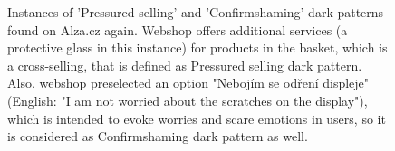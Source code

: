             \begin{figure}[ht]
                \RawFloats
                \centering
                \begin{minipage}[ht]{0.55\linewidth}
                    \strut\vspace*{-\baselineskip}\newline
                    \centering
                    \caption{Instances of 'Pressured selling' and 'Confirmshaming' dark patterns found on Alza.cz again. Webshop offers additional services (a protective glass in this instance) for products in the basket, which is a cross-selling, that is defined as Pressured selling dark pattern. Also, webshop preselected an option "Nebojím se odření displeje" (English: "I am not worried about the scratches on the display"), which is intended to evoke worries and scare emotions in users, so it is considered as Confirmshaming dark pattern as well.}
                    \label{fig:pressured-selling-alza1}
                \end{minipage}
                \hfill
                \begin{minipage}[ht]{0.40\linewidth}
                    \strut\vspace*{-\baselineskip}\newline
                    \centering

\end{minipage}
\end{figure}
